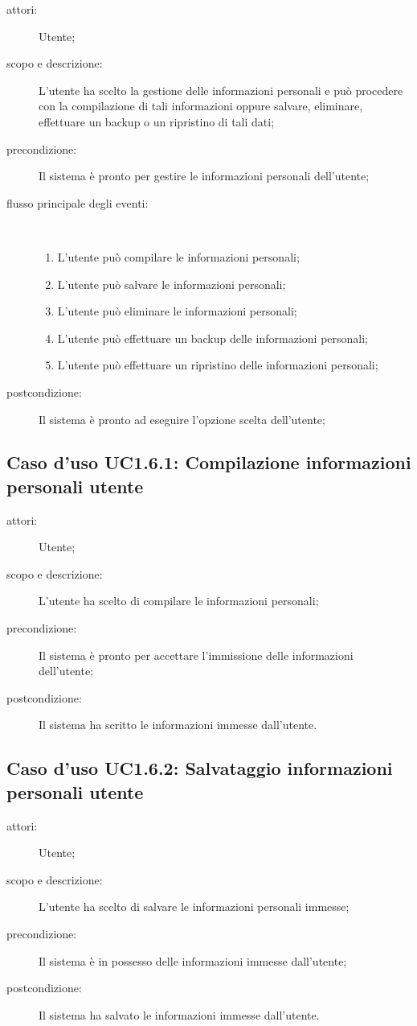 \begin{description}
\item[attori:] Utente;
\item[scopo e descrizione:] L'utente ha scelto la gestione delle informazioni personali e può procedere con la compilazione di tali informazioni oppure salvare, eliminare, effettuare un backup o un ripristino di tali dati;
\item[precondizione:] Il sistema è pronto per gestire le informazioni personali dell'utente;
\item[flusso principale degli eventi:] \hfill \\
	\begin{enumerate}
	\item L'utente può compilare le informazioni personali;
	\item L'utente può salvare le informazioni personali;
	\item L'utente può eliminare le informazioni personali;
	\item L'utente può effettuare un backup delle informazioni personali;
	\item L'utente può effettuare un ripristino delle informazioni personali;
	\end{enumerate}
\item[postcondizione:] Il sistema è pronto ad eseguire l'opzione scelta dell'utente;
\end{description}

\subsection{Caso d'uso UC1.6.1: Compilazione informazioni personali utente}
\begin{description}
\item[attori:] Utente;
\item[scopo e descrizione:] L'utente ha scelto di compilare le informazioni personali;
\item[precondizione:] Il sistema è pronto per accettare l'immissione delle informazioni dell'utente;
\item[postcondizione:] Il sistema ha scritto le informazioni immesse dall'utente.
\end{description}

\subsection{Caso d'uso UC1.6.2: Salvataggio informazioni personali utente}
\begin{description}
\item[attori:] Utente;
\item[scopo e descrizione:] L'utente ha scelto di salvare le informazioni personali immesse;
\item[precondizione:] Il sistema è in possesso delle informazioni immesse dall'utente;
\item[postcondizione:] Il sistema ha salvato le informazioni immesse dall'utente.
\end{description}

